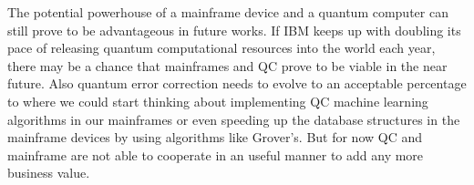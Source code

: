 \documentclass[a0,portrait]{a0poster}
\begin{document}
\begin{multicols}{2}
The potential powerhouse of a mainframe device and a quantum computer can still prove
to be advantageous in future works. If IBM keeps up with doubling its pace of releasing
quantum computational resources into the world each year, there may be a chance that
mainframes and QC prove to be viable in the near future. Also quantum error correction
needs to evolve to an acceptable percentage to where we could start thinking about
implementing QC machine learning algorithms in our mainframes or even speeding up
the database structures in the mainframe devices by using algorithms like Grover’s. But for now QC
and mainframe are not able to cooperate in an useful manner to add any more business value.



\end{multicols}
\end{document}
